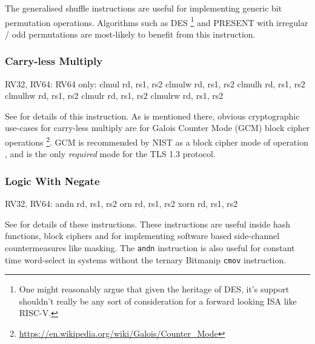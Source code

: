 The generalised shuffle instructions are useful for implementing
generic bit permutation operations.
Algorithms such as 
DES \footnote{
One might reasonably argue that given the heritage of DES, it's support
shouldn't really be any sort of consideration for a forward looking
ISA like RISC-V.
}
and
PRESENT\cite{block:present} with
irregular / odd permutations are most-likely to benefit from this
instruction.

\subsubsection{Carry-less Multiply}

\begin{cryptobitmanipisa}
RV32, RV64:                         RV64 only:
    clmul rd, rs1, rs2                  clmulw rd, rs1, rs2
    clmulh rd, rs1, rs2                 clmulhw rd, rs1, rs2
    clmulr rd, rs1, rs2                 clmulrw rd, rs1, rs2
\end{cryptobitmanipisa}

See \cite[Section 2.6]{riscv:bitmanip:draft} for details of
this instruction.
As is mentioned there, obvious cryptographic use-cases for carry-less
multiply are for Galois Counter Mode (GCM) block cipher operations
\footnote{\url{https://en.wikipedia.org/wiki/Galois/Counter_Mode}}.
GCM is recommended by NIST as a block cipher mode of operation
\cite{nist:gcm}, and is the only {\em required} mode for the TLS 1.3
protocol.



\subsubsection{Logic With Negate}

\begin{cryptobitmanipisa}
RV32, RV64:
    andn rd, rs1, rs2
     orn rd, rs1, rs2
    xorn rd, rs1, rs2
\end{cryptobitmanipisa}

See \cite[Section 2.1.3]{riscv:bitmanip:draft} for details of
these instructions.
These instructions are useful inside hash functions, block ciphers and
for implementing software based side-channel countermeasures like masking.
The {\tt andn} instruction is also useful for constant time word-select
in systems without the ternary Bitmanip {\tt cmov} instruction.


